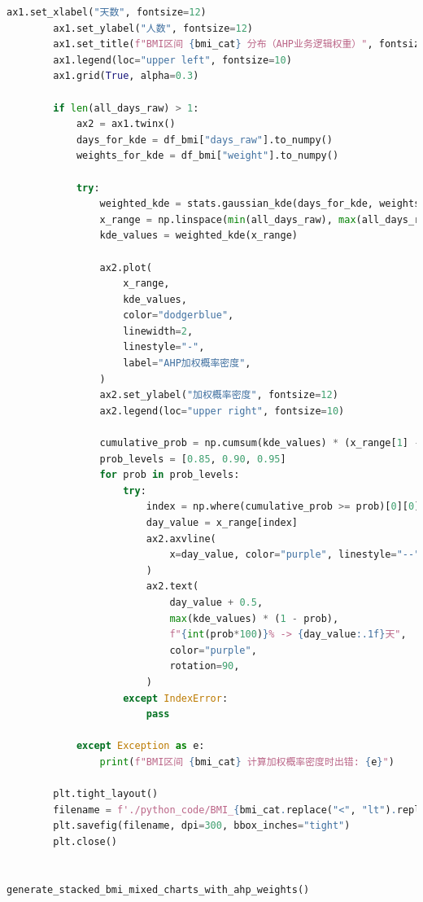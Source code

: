 \documentclass{article}
\begin{document}
\begin{lstlisting}[language=Python, caption={C(2)(权重计算).py}, label={code:python_example}]
        ax1.set_xlabel("天数", fontsize=12)
        ax1.set_ylabel("人数", fontsize=12)
        ax1.set_title(f"BMI区间 {bmi_cat} 分布（AHP业务逻辑权重）", fontsize=14)
        ax1.legend(loc="upper left", fontsize=10)
        ax1.grid(True, alpha=0.3)

        if len(all_days_raw) > 1:
            ax2 = ax1.twinx()
            days_for_kde = df_bmi["days_raw"].to_numpy()
            weights_for_kde = df_bmi["weight"].to_numpy()

            try:
                weighted_kde = stats.gaussian_kde(days_for_kde, weights=weights_for_kde)
                x_range = np.linspace(min(all_days_raw), max(all_days_raw), 1000)
                kde_values = weighted_kde(x_range)

                ax2.plot(
                    x_range,
                    kde_values,
                    color="dodgerblue",
                    linewidth=2,
                    linestyle="-",
                    label="AHP加权概率密度",
                )
                ax2.set_ylabel("加权概率密度", fontsize=12)
                ax2.legend(loc="upper right", fontsize=10)

                cumulative_prob = np.cumsum(kde_values) * (x_range[1] - x_range[0])
                prob_levels = [0.85, 0.90, 0.95]
                for prob in prob_levels:
                    try:
                        index = np.where(cumulative_prob >= prob)[0][0]
                        day_value = x_range[index]
                        ax2.axvline(
                            x=day_value, color="purple", linestyle="--", linewidth=1
                        )
                        ax2.text(
                            day_value + 0.5,
                            max(kde_values) * (1 - prob),
                            f"{int(prob*100)}% -> {day_value:.1f}天",
                            color="purple",
                            rotation=90,
                        )
                    except IndexError:
                        pass

            except Exception as e:
                print(f"BMI区间 {bmi_cat} 计算加权概率密度时出错: {e}")

        plt.tight_layout()
        filename = f'./python_code/BMI_{bmi_cat.replace("<", "lt").replace(">", "gt").replace("-", "_")}_AHP_weighted_dist.png'
        plt.savefig(filename, dpi=300, bbox_inches="tight")
        plt.close()


generate_stacked_bmi_mixed_charts_with_ahp_weights()
\end{lstlisting}
\end{document}
